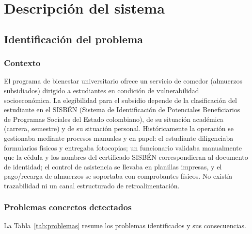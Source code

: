 \documentclass[stu,11pt,floatsintext]{apa7}
\begin{document}
\section{Descripción del sistema}

\subsection{Identificación del problema}

\subsubsection{Contexto}
El programa de bienestar universitario ofrece un servicio de comedor (almuerzos
subsidiados) dirigido a estudiantes en condición de vulnerabilidad socioeconómica. La
elegibilidad para el subsidio depende de la clasificación del estudiante en el SISBÉN
(Sistema de Identificación de Potenciales Beneficiarios de Programas Sociales del Estado
colombiano), de su situación académica (carrera, semestre) y de su situación personal.
Históricamente la operación se gestionaba mediante procesos manuales y en papel: el
estudiante diligenciaba formularios físicos y entregaba fotocopias; un funcionario
validaba manualmente que la cédula y los nombres del certificado SISBÉN correspondieran
al documento de identidad; el control de asistencia se llevaba en planillas impresas, y
el pago/recarga de almuerzos se soportaba con comprobantes físicos. No existía
trazabilidad ni un canal estructurado de retroalimentación.

\subsubsection{Problemas concretos detectados}
La Tabla~\ref{tab:problemas} resume los problemas identificados y sus consecuencias.
\end{document}
